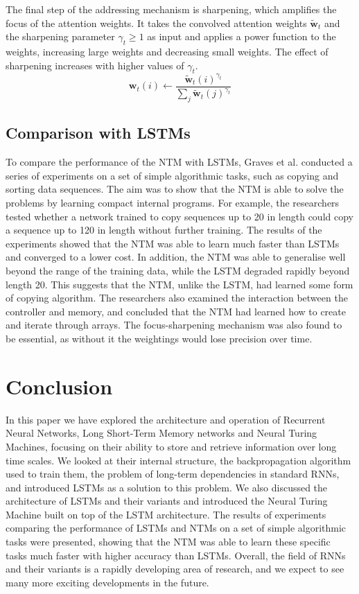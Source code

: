 \documentclass{article}
\begin{document}
The final step of the addressing mechanism is sharpening, which amplifies the focus of the
attention weights. It takes the convolved attention weights $\tilde{\textbf{w}}_t$ and the
sharpening parameter $\gamma_t \geq 1$ as input and applies a power function to the
weights, increasing large weights and decreasing small weights. The effect of sharpening
increases with higher values of $\gamma_t$.
\begin{equation}
  \textbf{w}_t(i) \leftarrow \frac{\tilde{\textbf{w}}_t(i)^{\gamma_t}}{\sum_{j} \tilde{\textbf{w}}_t(j)^{\gamma_t}}
\end{equation}


\subsection{Comparison with LSTMs}
\label{sec:4.2}

To compare the performance of the NTM with LSTMs, Graves et al. conducted a series of
experiments on a set of simple algorithmic tasks, such as copying and sorting data
sequences. The aim was to show that the NTM is able to solve the problems by learning
compact internal programs. For example, the researchers tested whether a network trained
to copy sequences up to 20 in length could copy a sequence up to 120 in length without
further training. The results of the experiments showed that the NTM was able to learn
much faster than LSTMs and converged to a lower cost. In addition, the NTM was able to
generalise well beyond the range of the training data, while the LSTM degraded rapidly
beyond length 20. This suggests that the NTM, unlike the LSTM, had learned some form of
copying algorithm. The researchers also examined the interaction between the controller
and memory, and concluded that the NTM had learned how to create and iterate through
arrays. The focus-sharpening mechanism was also found to be essential, as without it the
weightings would lose precision over time.


\section{Conclusion}
\label{ch:5}

In this paper we have explored the architecture and operation of Recurrent Neural
Networks, Long Short-Term Memory networks and Neural Turing Machines, focusing on their
ability to store and retrieve information over long time scales. We looked at their
internal structure, the backpropagation algorithm used to train them, the problem of
long-term dependencies in standard RNNs, and introduced LSTMs as a solution to this
problem. We also discussed the architecture of LSTMs and their variants and introduced the
Neural Turing Machine built on top of the LSTM architecture. The results of experiments
comparing the performance of LSTMs and NTMs on a set of simple algorithmic tasks were
presented, showing that the NTM was able to learn these specific tasks much faster with
higher accuracy than LSTMs. Overall, the field of RNNs and their variants is a rapidly
developing area of research, and we expect to see many more exciting developments in the
future.



\newpage
\nocite{}


\end{document}
